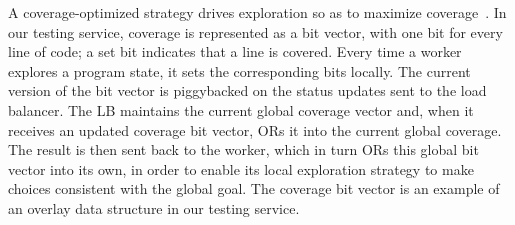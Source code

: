 A coverage-optimized strategy drives exploration so as to maximize coverage~\cite{klee}.  In our testing service, coverage is represented as a bit vector, with one bit for every line of code; a set bit indicates that a line is covered.  Every time a worker explores a program state, it sets the corresponding bits locally. The current version of the bit vector is piggybacked on the status updates sent to the load balancer.  The LB maintains the current global coverage vector and, when it receives an updated coverage bit vector, {\small OR}s it into the current global coverage.  The result is then sent back to the worker, which in turn {\small OR}s this global bit vector into its own, in order to enable its local exploration strategy to make choices consistent with the global goal.  The coverage bit vector is an example of an overlay data structure in our testing service.

